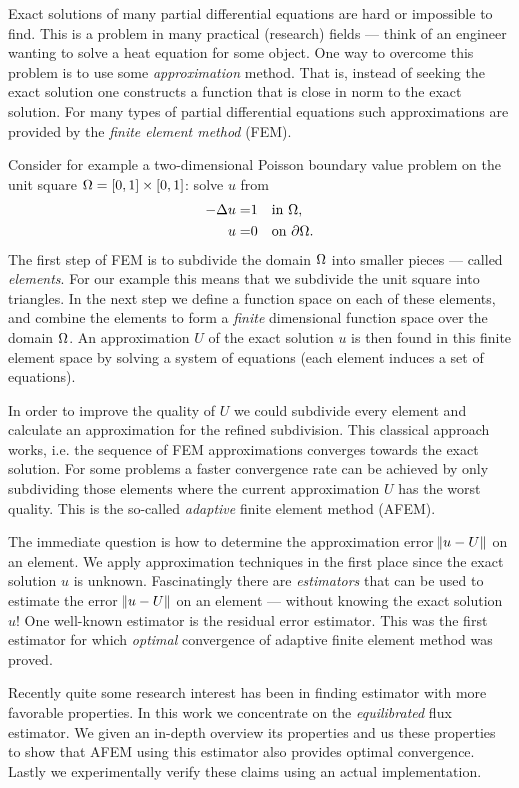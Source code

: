 \documentclass[thesis.tex]{subfiles}
\begin{document}
Exact solutions of many partial differential equations are hard or impossible to find. 
This is a problem in many practical (research) fields --- think of an engineer wanting to solve a heat
equation for some object. One way to overcome this problem is to use some \emph{approximation} method.
That is, instead of seeking the exact solution one constructs a function that is close in norm to the exact solution.
For many types of partial differential equations such approximations are provided by the \emph{finite element method} (FEM).

Consider for example a two-dimensional Poisson
boundary value problem on the unit square $\Omega = [0,1] \times [0,1]$: solve $u$ from
  \begin{equation*}
  \begin{alignedat}{2}
    -\Delta u &=&1 \quad &\text {in } \Omega, \\
    u &=& 0 \quad &\text{on } \partial\Omega.
  \end{alignedat}
\end{equation*}
The first step of FEM is to subdivide the domain $\Omega$ into smaller pieces --- called \emph{elements}. 
For our example this means that
we subdivide the unit square into triangles. In the next step we define a function space on each of these elements, and
combine the elements to form a \emph{finite} dimensional function space over the domain $\Omega$. An approximation $U$ of the exact solution $u$
is then found in this finite element space by solving a system of equations (each element induces a set of equations).

In order to improve the quality of $U$ we could subdivide every element and calculate an approximation for the
refined subdivision. This classical approach works, i.e. the sequence of FEM approximations converges towards the exact solution.
For some problems a faster convergence rate can be achieved by only subdividing
those elements where the current approximation $U$ has the worst quality. This is the so-called \emph{adaptive} finite element method (AFEM).

The immediate question is how to determine the approximation error $\norm{u - U}$ on an element. We apply approximation techniques
in the first place since the exact solution $u$ is unknown. Fascinatingly there are \emph{estimators} that can be used
to estimate the error $\norm{u - U}$ on an element --- without knowing the exact solution $u$! One well-known
estimator is the residual error estimator. This was the first estimator for which \emph{optimal} convergence of adaptive finite element 
method was proved.

Recently quite some research interest has been in finding estimator with more favorable properties.
In this work we concentrate on the \emph{equilibrated} flux estimator. We given an in-depth overview its
properties and us these properties to show that AFEM using this estimator also provides optimal convergence.
Lastly we experimentally verify these claims using an actual implementation.
\end{document}

